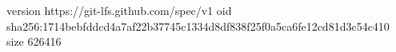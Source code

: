 version https://git-lfs.github.com/spec/v1
oid sha256:1714bebfddcd4a7af22b37745c1334d8df838f25f0a5ca6fe12cd81d3c54c410
size 626416
